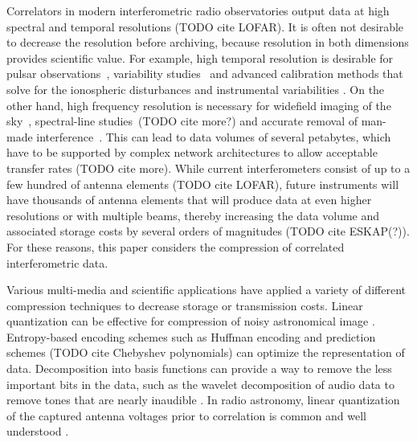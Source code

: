 \documentclass{article}
\begin{document}
Correlators in modern interferometric radio observatories output data at high spectral and temporal resolutions \cite{evla-perley-2011,mwa-2013-tingay,atca-broadband-backend-2011} (TODO cite LOFAR). It is often not desirable to decrease the resolution before archiving, because resolution in both dimensions provides scientific value. For example, high temporal resolution is desirable for pulsar observations~\cite{ska-pulsars-2009}, variability studies~\cite{lofar-pulsars-and-transients-2011} and advanced calibration methods that solve for the ionospheric disturbances and instrumental variabilities \cite{kazemi-clustered-cal-2013,revisiting-me-ii}. On the other hand, high frequency resolution is necessary for widefield imaging of the sky~\cite{big-book-on-synthesis-imaging}, spectral-line studies~\cite{evla-high-resolution-lines}(TODO cite more?) and accurate removal of man-made interference~\cite{lofar-radio-environment}. This can lead to data volumes of several petabytes, which have to be supported by complex network architectures to allow acceptable transfer rates \cite{lofar-processing-arch-2005} (TODO cite more). While current interferometers consist of up to a few hundred of antenna elements \cite{evla-perley-2011,mwa-2013-tingay,atca-broadband-backend-2011} (TODO cite LOFAR), future instruments will have thousands of antenna elements that will produce data at even higher resolutions or with multiple beams, thereby increasing the data volume and associated storage costs by several orders of magnitudes \cite{apertif-2010,ska-station-config-2013} (TODO cite ESKAP(?)). For these reasons, this paper considers the compression of correlated interferometric data.

Various multi-media and scientific applications have applied a variety of different compression techniques to decrease storage or transmission costs. Linear quantization can be effective for compression of noisy astronomical image \cite{astro-image-compression-2010}. Entropy-based encoding schemes such as Huffman encoding \cite{huffman} and prediction schemes (TODO cite Chebyshev polynomials) can optimize the representation of data. Decomposition into basis functions can provide a way to remove the less important bits in the data, such as the wavelet decomposition of audio data to remove tones that are nearly inaudible \cite{wavelet-audio-compression-1993}. In radio astronomy, linear quantization of the captured antenna voltages prior to correlation is common and well understood \cite{quantization-efficiency-2007}.

\end{document}
